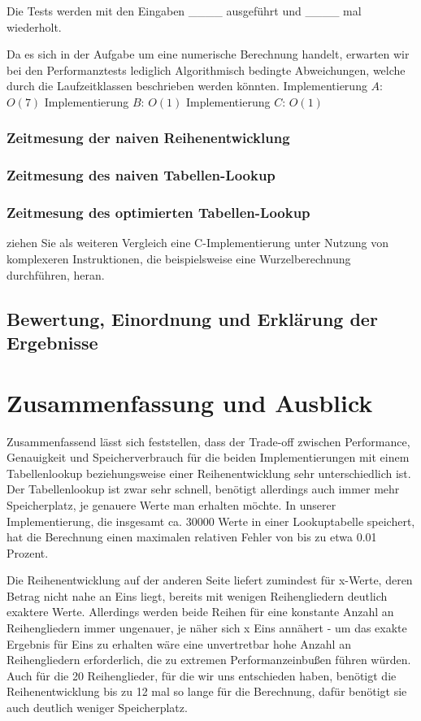 \documentclass[course=erap] {aspdoc}
\begin{document}
    Die Tests werden mit den Eingaben ____ ausgeführt und ____ mal wiederholt.

    Da es sich in der Aufgabe um eine numerische Berechnung handelt, erwarten wir bei den Performanztests lediglich Algorithmisch bedingte Abweichungen, welche durch die Laufzeitklassen beschrieben werden könnten.
    Implementierung $A$: $O(7)$
    Implementierung $B$: $O(1)$
    Implementierung $C$: $O(1)$

    \subsubsection{Zeitmesung der naiven Reihenentwicklung}

    \subsubsection{Zeitmesung des naiven Tabellen-Lookup}

    \subsubsection{Zeitmesung des optimierten Tabellen-Lookup}
    ziehen Sie als weiteren Vergleich eine C-Implementierung unter Nutzung von komplexeren Instruktionen, die beispielsweise eine Wurzelberechnung durchführen, heran.

    \subsection{Bewertung, Einordnung und Erklärung der Ergebnisse}


    \section{Zusammenfassung und Ausblick}

    Zusammenfassend lässt sich feststellen, dass der Trade-off zwischen Performance, Genauigkeit und Speicherverbrauch für die beiden Implementierungen mit einem Tabellenlookup beziehungsweise einer Reihenentwicklung sehr unterschiedlich ist. Der Tabellenlookup ist zwar sehr schnell, benötigt allerdings auch immer mehr Speicherplatz, je genauere Werte man erhalten möchte. In unserer Implementierung, die insgesamt ca. 30000 Werte in einer Lookuptabelle speichert, hat die Berechnung einen maximalen relativen Fehler von bis zu etwa 0.01 Prozent. 
    
    Die Reihenentwicklung auf der anderen Seite liefert zumindest für x-Werte, deren Betrag nicht nahe an Eins liegt, bereits mit wenigen Reihengliedern deutlich exaktere Werte. Allerdings werden beide Reihen für eine konstante Anzahl an Reihengliedern immer ungenauer, je näher sich x Eins annähert - um das exakte Ergebnis für Eins zu erhalten wäre eine unvertretbar hohe Anzahl an Reihengliedern erforderlich, die zu extremen Performanzeinbußen führen würden.
    Auch für die 20 Reihenglieder, für die wir uns entschieden haben, benötigt die Reihenentwicklung bis zu 12 mal so lange für die Berechnung, dafür benötigt sie auch deutlich weniger Speicherplatz. 
\end{document}
